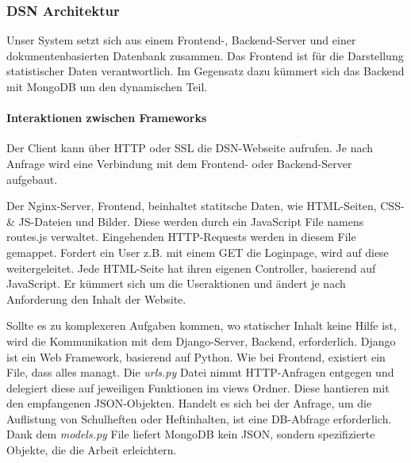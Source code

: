
\newpage

\subsubsection{DSN Architektur}
Unser System setzt sich aus einem Frontend-, Backend-Server und einer dokumentenbasierten Datenbank zusammen. Das Frontend ist für die Darstellung statistischer Daten verantwortlich. Im Gegensatz dazu kümmert sich das Backend mit MongoDB um den dynamischen Teil.
\paragraph{Interaktionen zwischen Frameworks}

Der Client kann über HTTP oder SSL die DSN-Webseite aufrufen. Je nach Anfrage wird eine Verbindung mit dem Frontend- oder Backend-Server aufgebaut.

Der Nginx-Server, Frontend, beinhaltet statitsche Daten, wie HTML-Seiten, CSS- \& JS-Dateien und Bilder. Diese werden durch ein JavaScript File namens routes.js verwaltet. Eingehenden HTTP-Requests werden in diesem File gemappet. Fordert ein User z.B. mit einem GET die Loginpage, wird auf diese weitergeleitet. Jede HTML-Seite hat ihren eigenen Controller, basierend auf JavaScript. Er kümmert sich um die Useraktionen und ändert je nach Anforderung den Inhalt der Website.


Sollte es zu komplexeren Aufgaben kommen, wo statischer Inhalt keine Hilfe ist, wird die Kommunikation mit dem Django-Server, Backend, erforderlich. Django ist ein Web Framework, basierend auf Python. Wie bei Frontend, existiert ein File, dass alles managt. Die \textit{urls.py} Datei nimmt HTTP-Anfragen entgegen und delegiert diese auf jeweiligen Funktionen im views Ordner. Diese hantieren mit den empfangenen JSON-Objekten. Handelt es sich bei der Anfrage, um die Auflistung von Schulheften oder Heftinhalten, ist eine DB-Abfrage erforderlich.\\
Dank dem \textit{models.py} File liefert MongoDB kein JSON, sondern spezifizierte Objekte, die die Arbeit erleichtern.


